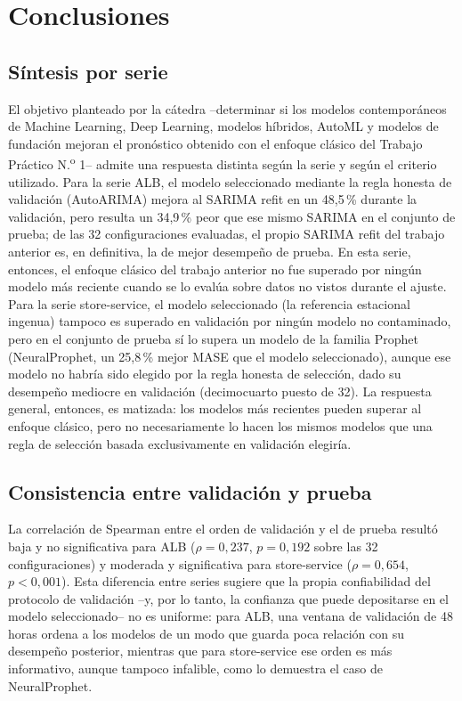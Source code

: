 \section{Conclusiones}

\subsection{Síntesis por serie}

El objetivo planteado por la cátedra --determinar si los modelos contemporáneos de Machine Learning, Deep
Learning, modelos híbridos, AutoML y modelos de fundación mejoran el pronóstico obtenido con el enfoque
clásico del Trabajo Práctico N.\textsuperscript{o} 1-- admite una respuesta distinta según la serie y según
el criterio utilizado. Para la serie ALB, el modelo seleccionado mediante la regla honesta de validación
(AutoARIMA) mejora al SARIMA refit en un 48,5\,\% durante la validación, pero resulta un 34,9\,\% peor que
ese mismo SARIMA en el conjunto de prueba; de las 32 configuraciones evaluadas, el propio SARIMA refit del
trabajo anterior es, en definitiva, la de mejor desempeño de prueba. En esta serie, entonces, el enfoque
clásico del trabajo anterior no fue superado por ningún modelo más reciente cuando se lo evalúa sobre datos
no vistos durante el ajuste. Para la serie store-service, el modelo seleccionado (la referencia estacional
ingenua) tampoco es superado en validación por ningún modelo no contaminado, pero en el conjunto de prueba
sí lo supera un modelo de la familia Prophet (NeuralProphet, un 25,8\,\% mejor MASE que el modelo
seleccionado), aunque ese modelo no habría sido elegido por la regla honesta de selección, dado su
desempeño mediocre en validación (decimocuarto puesto de 32). La respuesta general, entonces, es matizada:
los modelos más recientes pueden superar al enfoque clásico, pero no necesariamente lo hacen los mismos
modelos que una regla de selección basada exclusivamente en validación elegiría.

\subsection{Consistencia entre validación y prueba}

La correlación de Spearman entre el orden de validación y el de prueba resultó baja y no significativa
para ALB ($\rho=0,237$, $p=0,192$ sobre las 32 configuraciones) y moderada y significativa para
store-service ($\rho=0,654$, $p<0,001$). Esta diferencia entre series sugiere que la propia confiabilidad
del protocolo de validación --y, por lo tanto, la confianza que puede depositarse en el modelo
seleccionado-- no es uniforme: para ALB, una ventana de validación de 48 horas ordena a los modelos de un
modo que guarda poca relación con su desempeño posterior, mientras que para store-service ese orden es más
informativo, aunque tampoco infalible, como lo demuestra el caso de NeuralProphet.

